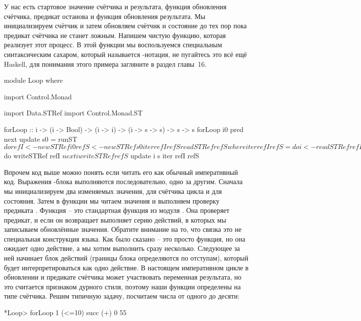 У нас есть стартовое значение счётчика и результата, функция обновления
счётчика, предикат останова и функция обновления результата.
Мы инициализируем счётчик и затем обновляем счётчик и
состояние до тех пор пока предикат счётчика не станет ложным.
Напишем чистую функцию, которая реализует этот процесс. 
В этой функции мы воспользуемся специальным синтаксическим
сахаром, который называется -нотация, не пугайтесь это
всё ещё Haskell, для понимания этого примера 
загляните в раздел  главы~16. 

\begin{code}
module Loop where

import Control.Monad

import Data.STRef
import Control.Monad.ST

forLoop ::  i -> (i -> Bool) -> (i -> i) -> (i -> s -> s) -> s -> s
forLoop i0 pred next update s0 = runST $ do
    refI <- newSTRef i0
    refS <- newSTRef s0
    iter refI refS
    readSTRef refS
    where iter refI refS = do
            i <- readSTRef refI
            s <- readSTRef refS
            when (pred i) $ do
                writeSTRef refI $ next i
                writeSTRef refS $ update i s
                iter refI refS
\end{code}

Впрочем код выше можно понять если читать его как 
обычный императивный код. Выражения -блока выполняются 
последовательно, одно за другим. Сначала мы инициализируем 
два изменяемых значения, для счётчика цикла и для состояния. 
Затем в функции  мы читаем значения и выполняем
проверку предиката . Функция  -- это
стандартная функция из модуля .
Она проверяет предикат, и если он возвращает  
выполняет серию действий, в которых мы записываем
обновлённые значения. Обратите внимание на то, что
связка  это не специальная конструкция языка.
Как было сказано  -- это просто функция, но
она ожидает одно действие, а мы хотим выполнить сразу несколько.
Следующее за ней  начинает блок действий (границы блока 
определяются по отступам), который будет интерпретироваться как
одно действие.
В настоящем императивном цикле в обновлении и предикате счётчика 
может участвовать переменная результата, но это считается 
признаком дурного стиля, поэтому наши функции определены
на типе счётчика. Решим типичную задачу, посчитаем
числа от одного до десяти:

\begin{code}
*Loop> forLoop 1 (<=10) succ (+) 0
55
\end{code}


